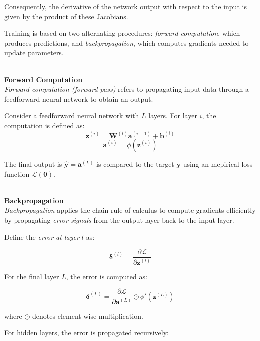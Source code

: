 Consequently, the derivative of the network output with respect to the input is given by the product of these Jacobians.

Training is based on two alternating procedures: \emph{forward computation}, which produces predictions, and \emph{backpropagation}, which computes gradients needed to update parameters.

\textbf{\\Forward Computation\\}
\emph{Forward computation (forward pass)} refers to propagating input data through \break a feedforward neural network to obtain an output.

Consider a feedforward neural network with \( L \) layers. For layer \( i \), the computation is defined as:
\begin{equation*}
\mathbf{z}^{(i)} = \mathbf{W}^{(i)} \mathbf{a}^{(i-1)} + \mathbf{b}^{(i)}
\end{equation*}
\begin{equation*}
\mathbf{a}^{(i)} = \phi\!\left(\mathbf{z}^{(i)}\right)
\end{equation*}

The final output is \( \hat{\mathbf{y}}=\mathbf{a}^{(L)} \)  is compared to the target \( \mathbf{y} \) using an mepirical loss \break function \( \mathcal{L}(\boldsymbol{\theta}) \).

\textbf{\\Backpropagation\\}
\emph{Backpropagation} applies the chain rule of calculus to compute gradients efficiently by propagating \emph{error signals} from the output layer back to the input layer.

Define the \emph{error at layer \( l \)} as:

\begin{equation*}
\boldsymbol{\delta}^{(l)} = \frac{\partial \mathcal{L}}{\partial \mathbf{z}^{(l)}}
\end{equation*}

For the final layer \( L \), the error is computed as:

\begin{equation*}
\boldsymbol{\delta}^{(L)} =
\frac{\partial \mathcal{L}}{\partial \mathbf{a}^{(L)}} \odot \phi'\!\left(\mathbf{z}^{(L)}\right)
\end{equation*}

where \( \odot \) denotes element-wise multiplication.

For hidden layers, the error is propagated recursively:

